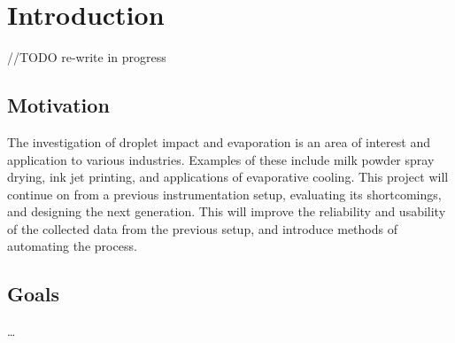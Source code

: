 \chapter{Introduction}\label{C:intro}

//TODO re-write in progress

\section{Motivation}

The investigation of droplet impact and evaporation is an area of interest and application to various industries. Examples of these include milk powder spray drying, ink jet printing, and applications of evaporative cooling. This project will continue on from a previous instrumentation setup, evaluating its shortcomings, and designing the next generation. This will improve the reliability and usability of the collected data from the previous setup, and introduce methods of automating the process. 

\section{Goals}
\dots